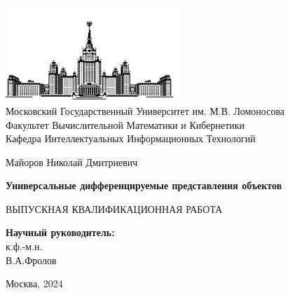 \documentclass[a4paper,hidelinks,12pt]{article}
\begin{document}
\begin {titlepage}
\thispagestyle{empty}

\begin{center}
	\vspace{-1cm}
	
	
	\includegraphics[width=0.5\textwidth]{msu}\\
	Московский Государственный Университет им. М.В. Ломоносова\\
	Факультет Вычислительной Математики и Кибернетики\\
	Кафедра Интеллектуальных Информационных Технологий\\
	
	\vspace{3cm}
	
	{\Large Майоров Николай Дмитриевич}
	
	\vspace{1cm}
	
	{\LARGE\bfseries Универсальные дифференцируемые представления объектов\\}
	
	\vspace{1cm}
	
	{ ВЫПУСКНАЯ КВАЛИФИКАЦИОННАЯ РАБОТА}
\end{center}

\vfill

\begin{flushright}
	\textbf {Научный руководитель:}\\
	к.ф.-м.н.\\
	В.А.Фролов\\
	\vspace{10mm}
\end{flushright}

\vfill

\begin{center}
	Москва, 2024
\end{center}

\end{titlepage}

\setcounter{page}{2}
\onehalfspacing
\end{document}
